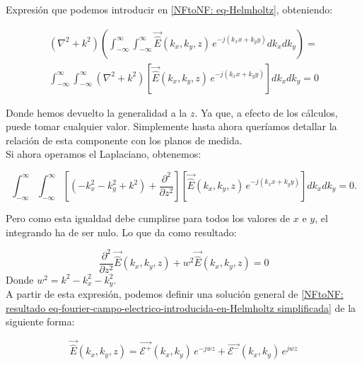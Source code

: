 \documentclass{article}
\begin{document}
Expresión que podemos introducir en \eqref{NFtoNF: eq-Helmholtz}, obteniendo:

\begin{multline}
\left(\nabla^{2}+k^{2}\right)\left(\int_{-\infty}^{\infty}\int_{-\infty}^{\infty}\vec{\hat{E}}(k_{x},k_{y},z)
\,e^{-j (k_{x} x+k_{y} y)} dk_{x}
dk_{y}\right)=\\
\int_{-\infty}^{\infty}\int_{-\infty}^{\infty}\left(\nabla^{2}+k^{2}\right)\left[\vec{\hat{E}}(k_{x},k_{y},z)
\,e^{-j (k_{x} x+k_{y} y)}\right] dk_{x} dk_{y}=0
\label{NFtoNF: eq-fourier-campo-electrico-introducida-en-Helmholtz}
\end{multline}

Donde hemos devuelto la generalidad a la $z$. Ya que, a efecto de los cálculos, puede tomar cualquier valor. Simplemente hasta ahora queríamos detallar la relación de esta componente con los planos de medida.
\\

Si ahora operamos el Laplaciano, obtenemos:

\begin{equation}
\int_{-\infty}^{\infty}\int_{-\infty}^{\infty}\left[\left(-k_{x}^{2}-k_{y}^{2}+k^{2}\right)+\frac{\partial^{2}}{\partial
z^{2}}\right]\left[\vec{\hat{E}}(k_{x},k_{y},z) \,e^{-j (k_{x}
x+k_{y} y)}\right] dk_{x} dk_{y}=0.
\label{NFtoNF: eq-fourier-campo-electrico-introducida-en-Helmholtz-con-laplaciano-operado}
\end{equation}

Pero como esta igualdad debe cumplirse para todos los valores de $x$ e $y$, el integrando ha de ser nulo. Lo que da como resultado:

\begin{equation}
\frac{\partial^{2}}{\partial
z^{2}}\vec{\hat{E}}(k_{x},k_{y},z)+w^{2}\vec{\hat{E}}(k_{x},k_{y},z)=0
\label{NFtoNF: resultado eq-fourier-campo-electrico-introducida-en-Helmholtz simplificada}
\end{equation}
Donde $w^{2}=k^{2}-k_{x}^{2}-k_{y}^{2}$.
\\

A partir de esta expresión, podemos definir una solución general de \eqref{NFtoNF: resultado eq-fourier-campo-electrico-introducida-en-Helmholtz simplificada} de la siguiente forma:

\begin{equation}
\vec{\hat{E}}(k_{x},k_{y},z)=\vec{\mathcal{E}^{+}}(k_{x},k_{y})\,e^{-j
w z}+\vec{\mathcal{E}^{-}}(k_{x},k_{y})\,e^{j w z}
\label{NFtoNF: solucion eq-fourier-campo-electrico-en-Helmholtz-general}
\end{equation}
\end{document}
